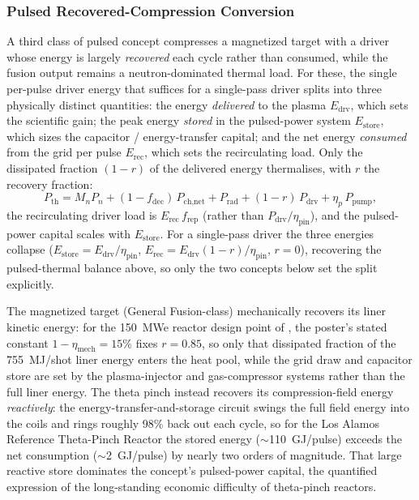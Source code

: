 \documentclass{article}
\begin{document}
\subsubsection{Pulsed Recovered-Compression Conversion}
A third class of pulsed concept compresses a magnetized target with a driver
whose energy is largely \emph{recovered} each cycle rather than consumed,
while the fusion output remains a neutron-dominated thermal load. For these,
the single per-pulse driver energy that suffices for a single-pass driver
splits into three physically distinct quantities: the energy \emph{delivered}
to the plasma $E_{\text{drv}}$, which sets the scientific gain; the peak
energy \emph{stored} in the pulsed-power system $E_{\text{store}}$, which sizes
the capacitor / energy-transfer capital; and the net energy \emph{consumed}
from the grid per pulse $E_{\text{rec}}$, which sets the recirculating load.
Only the dissipated fraction $(1-r)$ of the delivered energy thermalises,
with $r$ the recovery fraction:
\begin{equation}
P_{\text{th}} = M_n P_n + (1 - f_{\text{dec}})\,P_{\text{ch,net}}
  + P_{\text{rad}} + (1-r)\,P_{\text{drv}} + \eta_p\,P_{\text{pump}},
\end{equation}
the recirculating driver load is $E_{\text{rec}}\,f_{\text{rep}}$ (rather than
$P_{\text{drv}}/\eta_{\text{pin}}$), and the pulsed-power capital scales with
$E_{\text{store}}$. For a single-pass driver the three energies collapse
($E_{\text{store}} = E_{\text{drv}}/\eta_{\text{pin}}$,
$E_{\text{rec}} = E_{\text{drv}}(1-r)/\eta_{\text{pin}}$, $r = 0$), recovering
the pulsed-thermal balance above, so only the two concepts below set the split
explicitly.

The magnetized target (General Fusion-class) mechanically recovers its liner
kinetic energy: for the 150~MWe reactor design point of
\citet{krotez2023mtf}, the poster's stated constant
$1-\eta_{\text{mech}} = 15\%$ fixes $r = 0.85$, so only that dissipated
fraction of the 755~MJ/shot liner energy enters the heat pool, while the grid
draw and capacitor store are set by the plasma-injector and gas-compressor
systems rather than the full liner energy. The theta pinch instead recovers
its compression-field energy \emph{reactively}: the energy-transfer-and-storage
circuit swings the full field energy into the coils and rings roughly 98\% back
out each cycle, so for the Los Alamos Reference Theta-Pinch Reactor
\citep{burnett1972rtpr} the stored energy ($\sim$110~GJ/pulse) exceeds the net
consumption ($\sim$2~GJ/pulse) by nearly two orders of magnitude. That large
reactive store dominates the concept's pulsed-power capital, the quantified
expression of the long-standing economic difficulty of theta-pinch reactors.
\end{document}
